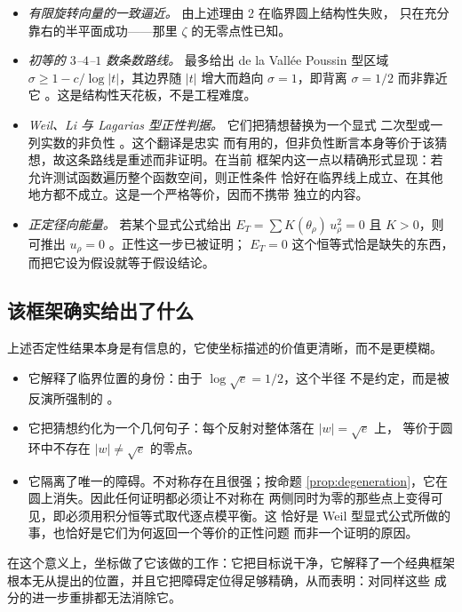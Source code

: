 \documentclass[submission,noinfoline]{jsfds}
\newcommand{\Lean}[1]{}
\newcommand{\abs}[1]{\lvert #1\rvert}
\begin{document}
\begin{itemize}
\item \emph{有限旋转向量的一致逼近。} 由上述理由 2 在临界圆上结构性失败，
只在充分靠右的半平面成功——那里 $\zeta$ 的无零点性已知。
\Lean{hiddenZeta_ne_zero_of_u_ge_three_halves_via_rouche}
\item \emph{初等的 $3$--$4$--$1$ 数条数路线。} 最多给出 de la Vall\'ee
Poussin 型区域 $\sigma\ge1-c/\log\abs t$，其边界随 $\abs t$ 增大而趋向
$\sigma=1$，即背离 $\sigma=1/2$ 而非靠近它
\citep{Titchmarsh1986}。这是结构性天花板，不是工程难度。
\item \emph{Weil、Li 与 Lagarias 型正性判据。} 它们把猜想替换为一个显式
二次型或一列实数的非负性 \citep{Weil1952,Lagarias2002}。这个翻译是忠实
而有用的，但非负性断言本身等价于该猜想，故这条路线是重述而非证明。在当前
框架内这一点以精确形式显现：若允许测试函数遍历整个函数空间，则正性条件
恰好在临界线上成立、在其他地方都不成立。这是一个严格等价，因而不携带
独立的内容。\Lean{fourth_direction_positivity_iff_critical}
\item \emph{正定径向能量。} 若某个显式公式给出
$E_T=\sum K(\theta_\rho)\,u_\rho^{2}=0$ 且 $K>0$，则可推出 $u_\rho=0$
\Lean{on_critical_line_of_weighted_energy_eq_zero}。正性这一步已被证明；
$E_T=0$ 这个恒等式恰是缺失的东西，而把它设为假设就等于假设结论。
\end{itemize}

\subsection{该框架确实给出了什么}

上述否定性结果本身是有信息的，它使坐标描述的价值更清晰，而不是更模糊。

\begin{itemize}
\item 它解释了临界位置的身份：由于 $\log\sqrt e=1/2$，这个半径
不是约定，而是被反演所强制的 \citep{LiuXu2026bridge}。
\item 它把猜想约化为一个几何句子：每个反射对整体落在 $\abs w=\sqrt e$ 上，
等价于圆环中不存在 $\abs w\neq\sqrt e$ 的零点。
\Lean{no_zero_off_circle}
\item 它隔离了唯一的障碍。不对称存在且很强；按命题
\ref{prop:degeneration}，它在圆上消失。因此任何证明都必须让不对称在
两侧同时为零的那些点上变得可见，即必须用积分恒等式取代逐点模平衡。这
恰好是 Weil 型显式公式所做的事，也恰好是它们为何返回一个等价的正性问题
而非一个证明的原因。
\end{itemize}

在这个意义上，坐标做了它该做的工作：它把目标说干净，它解释了一个经典框架
根本无从提出的位置，并且它把障碍定位得足够精确，从而表明：对同样这些
成分的进一步重排都无法消除它。
\end{document}
